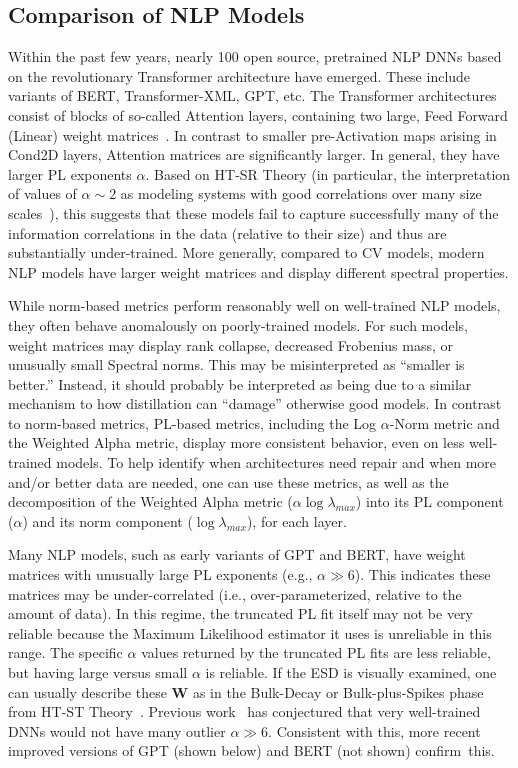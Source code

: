 \subsection{Comparison of NLP Models}
\label{sxn:nlp}

Within the past few years, nearly 100 open source, pretrained NLP DNNs based on the revolutionary Transformer architecture have emerged.
These include variants of BERT, Transformer-XML, GPT, etc.
The Transformer architectures consist of blocks of so-called Attention layers, containing two large, Feed Forward (Linear) weight matrices~\cite{Attn2017}. 
In contrast to smaller pre-Activation maps arising in Cond2D layers, Attention matrices are significantly larger.
In general, they have larger PL exponents $\alpha$.
Based on HT-SR Theory
(in particular, the interpretation of values of $\alpha \sim 2$ as modeling systems with good correlations over many size scales~\cite{BouchaudPotters03, SornetteBook}), 
this suggests that these models fail to capture successfully many of the information correlations in the data (relative to their size) and thus are substantially under-trained.
More generally, compared to CV models,
modern NLP models have larger weight matrices and display different spectral properties.

While norm-based metrics perform reasonably well on well-trained NLP models, they often behave anomalously on poorly-trained models.
For such models, weight matrices may display rank collapse, decreased Frobenius mass, or unusually small Spectral norms.
This may be misinterpreted as ``smaller is better.'' 
Instead, it should probably be interpreted as being due to a similar mechanism to how distillation can ``damage'' otherwise good models.
In contrast to norm-based metrics, PL-based metrics, including the Log $\alpha$-Norm metric and the Weighted Alpha metric, display more consistent behavior, even on less well-trained models.
To help identify when architectures need repair and when more and/or better data are needed,
one can use these metrics, 
as well as the decomposition of the Weighted Alpha metric ($\alpha\log\lambda_{max}$) into its PL component ($\alpha$) and its norm component ($\log\lambda_{max}$), for each layer.

Many NLP models, such as early variants of GPT and BERT, have weight matrices with unusually large PL exponents (e.g., $\alpha\gg 6$).
This indicates these matrices may be under-correlated (i.e., over-parameterized, relative to the amount of data).
In this regime, the truncated PL fit itself may not be very reliable because the Maximum Likelihood estimator it uses is unreliable in this range.
The specific $\alpha$ values returned by the truncated PL fits are less reliable, but having large versus small $\alpha$ is reliable.
If the ESD is visually examined, one can usually describe these $\mathbf{W}$ as in the Bulk-Decay or Bulk-plus-Spikes phase from HT-ST Theory~\cite{MM18_TR,MM19_HTSR_ICML}.
Previous work~\cite{MM18_TR,MM19_HTSR_ICML} has conjectured that very well-trained DNNs would not have many outlier $\alpha\gg 6$.
Consistent with this, more recent improved versions of GPT (shown below) and BERT (not shown) confirm~this.


